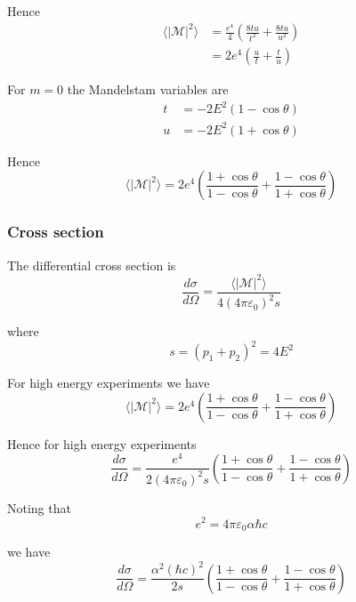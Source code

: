 Hence
\begin{align*}
\langle|\mathcal{M}|^2\rangle
&=
\frac{e^4}{4}
\left(
\frac{8tu}{t^2}
+\frac{8tu}{u^2}
\right)
\\
&=
2e^4
\left(
\frac{u}{t}
+\frac{t}{u}
\right)
\end{align*}

For $m=0$ the Mandelstam variables are
\begin{align*}
t&=-2E^2(1-\cos\theta)
\\
u&=-2E^2(1+\cos\theta)
\end{align*}

Hence
\begin{equation*}
\langle|\mathcal{M}|^2\rangle
=2e^4\left(
\frac{1+\cos\theta}{1-\cos\theta}+
\frac{1-\cos\theta}{1+\cos\theta}
\right)
\end{equation*}

\subsubsection*{Cross section}
The differential cross section is
\begin{equation*}
\frac{d\sigma}{d\Omega}=\frac{\langle|\mathcal{M}|^2\rangle}{4(4\pi\varepsilon_0)^2s}
\end{equation*}

where
\begin{equation*}
s=(p_1+p_2)^2=4E^2
\end{equation*}

For high energy experiments we have
\begin{equation*}
\langle|\mathcal{M}|^2\rangle=2e^4\left(
\frac{1+\cos\theta}{1-\cos\theta}+
\frac{1-\cos\theta}{1+\cos\theta}
\right)
\end{equation*}

Hence for high energy experiments
\begin{equation*}
\frac{d\sigma}{d\Omega}
=\frac{e^4}{2(4\pi\varepsilon_0)^2s}\left(\frac{1+\cos\theta}{1-\cos\theta}+\frac{1-\cos\theta}{1+\cos\theta}\right)
\end{equation*}

Noting that
\begin{equation*}
e^2=4\pi\varepsilon_0\alpha\hbar c
\end{equation*}

we have
\begin{equation*}
\frac{d\sigma}{d\Omega}
=
\frac{\alpha^2(\hbar c)^2}{2s}
\left(
\frac{1+\cos\theta}{1-\cos\theta}+
\frac{1-\cos\theta}{1+\cos\theta}
\right)
\end{equation*}

